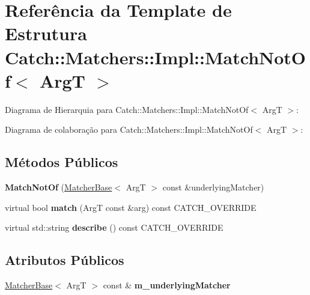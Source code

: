 \hypertarget{structCatch_1_1Matchers_1_1Impl_1_1MatchNotOf}{}\section{Referência da Template de Estrutura Catch\+:\+:Matchers\+:\+:Impl\+:\+:Match\+Not\+Of$<$ ArgT $>$}
\label{structCatch_1_1Matchers_1_1Impl_1_1MatchNotOf}


Diagrama de Hierarquia para Catch\+:\+:Matchers\+:\+:Impl\+:\+:Match\+Not\+Of$<$ ArgT $>$\+:


Diagrama de colaboração para Catch\+:\+:Matchers\+:\+:Impl\+:\+:Match\+Not\+Of$<$ ArgT $>$\+:
\subsection*{Métodos Públicos}
\begin{DoxyCompactItemize}
\item 
{\bfseries Match\+Not\+Of} (\hyperlink{structCatch_1_1Matchers_1_1Impl_1_1MatcherBase}{Matcher\+Base}$<$ ArgT $>$ const \&underlying\+Matcher)\hypertarget{structCatch_1_1Matchers_1_1Impl_1_1MatchNotOf_a47afdd9e4c3354cef85adc3186097ae4}{}\label{structCatch_1_1Matchers_1_1Impl_1_1MatchNotOf_a47afdd9e4c3354cef85adc3186097ae4}

\item 
virtual bool {\bfseries match} (ArgT const \&arg) const C\+A\+T\+C\+H\+\_\+\+O\+V\+E\+R\+R\+I\+DE\hypertarget{structCatch_1_1Matchers_1_1Impl_1_1MatchNotOf_a1b9ad6566e4ab0f292d2903f557307cc}{}\label{structCatch_1_1Matchers_1_1Impl_1_1MatchNotOf_a1b9ad6566e4ab0f292d2903f557307cc}

\item 
virtual std\+::string {\bfseries describe} () const C\+A\+T\+C\+H\+\_\+\+O\+V\+E\+R\+R\+I\+DE\hypertarget{structCatch_1_1Matchers_1_1Impl_1_1MatchNotOf_a62bdc7dcb9ff000438a4ed3d5483a248}{}\label{structCatch_1_1Matchers_1_1Impl_1_1MatchNotOf_a62bdc7dcb9ff000438a4ed3d5483a248}

\end{DoxyCompactItemize}
\subsection*{Atributos Públicos}
\begin{DoxyCompactItemize}
\item 
\hyperlink{structCatch_1_1Matchers_1_1Impl_1_1MatcherBase}{Matcher\+Base}$<$ ArgT $>$ const \& {\bfseries m\+\_\+underlying\+Matcher}\hypertarget{structCatch_1_1Matchers_1_1Impl_1_1MatchNotOf_af7ac67f112b0e93796b048a47329aad4}{}\label{structCatch_1_1Matchers_1_1Impl_1_1MatchNotOf_af7ac67f112b0e93796b048a47329aad4}

\end{DoxyCompactItemize}
